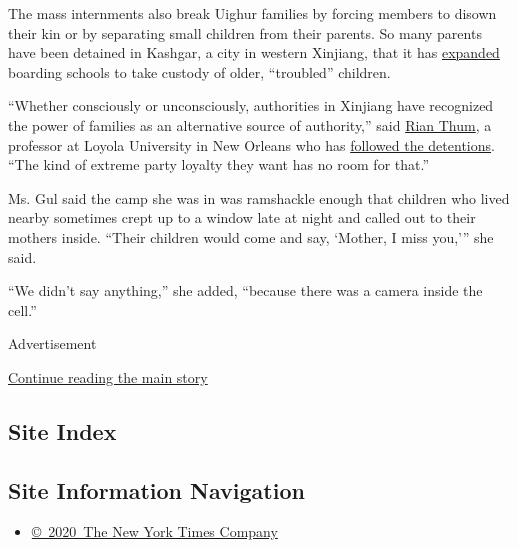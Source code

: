 The mass internments also break Uighur families by forcing members to
disown their kin or by separating small children from their parents. So
many parents have been detained in Kashgar, a city in western Xinjiang,
that it has \href{http://www.xjks.gov.cn/Item/41128.aspx}{expanded}
boarding schools to take custody of older, ``troubled'' children.

``Whether consciously or unconsciously, authorities in Xinjiang have
recognized the power of families as an alternative source of
authority,'' said
\href{http://cas.loyno.edu/history/bios/rian-thum}{Rian Thum}, a
professor at Loyola University in New Orleans who has
\href{https://www.nytimes3xbfgragh.onion/2018/05/15/opinion/china-re-education-camps.html}{followed
the detentions}. ``The kind of extreme party loyalty they want has no
room for that.''

Ms. Gul said the camp she was in was ramshackle enough that children who
lived nearby sometimes crept up to a window late at night and called out
to their mothers inside. ``Their children would come and say, `Mother, I
miss you,''' she said.

``We didn't say anything,'' she added, ``because there was a camera
inside the cell.''

Advertisement

\protect\hyperlink{after-bottom}{Continue reading the main story}

\hypertarget{site-index}{%
\subsection{Site Index}\label{site-index}}

\hypertarget{site-information-navigation}{%
\subsection{Site Information
Navigation}\label{site-information-navigation}}

\begin{itemize}
\tightlist
\item
  \href{https://help.nytimes3xbfgragh.onion/hc/en-us/articles/115014792127-Copyright-notice}{©~2020~The
  New York Times Company}
\end{itemize}

